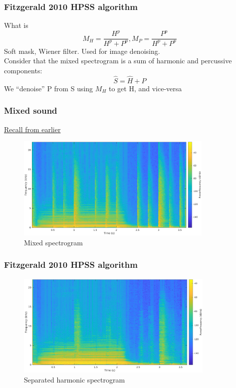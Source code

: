 \documentclass{beamer}
\begin{document}
\begin{frame}
	\frametitle{Fitzgerald 2010 HPSS algorithm}
	What is \[ M_{H} = \frac{H^{p}}{H^{p} + P^{p}}, M_{P} = \frac{P^{p}}{H^{p} + P^{p}} \]
	Soft mask, Wiener filter. Used for image denoising.\\
	Consider that the mixed spectrogram is a sum of harmonic and percussive components:
	\[ \hat{S} = \hat{H} + \hat{P} \]
	We ``denoise'' P from S using $M_{H}$ to get H, and vice-versa
\end{frame}

\begin{frame}
	\frametitle{Mixed sound}
	\href{run:../audio/mixed.wav}{Recall from earlier}\
	\begin{figure}
	\includegraphics[height=5cm]{../images/mixedspecgram.png}
		\caption{Mixed spectrogram}
	\end{figure}
\end{frame}

\begin{frame}
	\frametitle{Fitzgerald 2010 HPSS algorithm}
	\begin{figure}
	\includegraphics[height=5cm]{../images/harm_soft.png}
		\caption{Separated harmonic spectrogram}
	\end{figure}
\end{frame}
\end{document}
